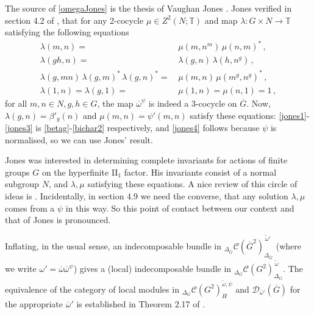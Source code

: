 \documentclass[12pt]{article}
\numberwithin{equation}{section}
\def\cC            {{\mathcal{C}}}
\def\cD            {{\mathcal{D}}}
\def\bbT           {\mathbb{T}}
\begin{document}
 The source of \eqref{omegaJones}
 is the thesis of Vaughan Jones \cite{Jon2}. Jones verified in  section 4.2 of \cite{Jon2},
 that for any  2-cocycle $\mu\in Z^2(N;\bbT)$ and map
 $\lambda:G\times N\rightarrow \bbT$ satisfying the following equations%
 \begin{align}
 \lambda(m,n)=&\,\mu(m,n^m)\,{\mu(n,m)^*}\,,\label{jones1}\\
 \lambda(gh,n)=&\,\lambda(g,n)\,\lambda(h,n^g)\,,\label{jones2}\\
 \lambda(g,mn)\,{\lambda(g,m)^*}\,{\lambda(g,n)^*}=&\,\mu(m,n)\,{\mu(m^g,n^g)^*}\,,\label{jones3}\\
 \lambda(1,n)=\lambda(g,1)=&\,\mu(1,n)=\mu(n,1)=1\,,\label{jones4}\end{align}
for all $m,n\in N,g,h\in G$, the map $\overline{\omega}^\psi$ 
 is indeed a 3-cocycle on $\overline{G}$. Now, $\lambda(g,n)=\beta'_g(n)$ and $\mu(m,n)=\psi'(m,n)$ satisfy these equations: \eqref{jones1}-\eqref{jones3} is
\eqref{betag}-\eqref{bichar2} respectively, and \eqref{jones4} follows because $\psi$ is normalised, so
we can use Jones' result.
 
Jones was interested in  determining complete invariants for actions of  finite groups $G$ on the
 hyperfinite II$_1$ factor. His invariants consist of a normal subgroup $N$, and $\lambda,\mu$ satisfying these equations. A nice review of this circle of ideas is \cite{RSW}. Incidentally, in section 4.9 we need the converse, that any solution $\lambda,\mu$ comes from a $\psi$ in this way. So this point of contact between our context and that of Jones is pronounced.



Inflating, in the usual sense, an
indecomposable bundle in ${}_{\Delta_{\bar{G}}}\cC(\overline{G}^2)_{\Delta_{\bar{G}}}^{\,\tilde{\omega}'}$ (where we write $\omega'=\overline{\omega}\overline{\omega}^\psi$)  gives a (local) indecomposable bundle in ${}_{\Delta_G}\cC(G^2)_{\Delta_G}^{\,\tilde{\omega}}$. The equivalence of the category of local modules in ${}_{\Delta_G}\cC(G^2)^{\tilde{\omega},\psi}_{H}$ and $\cD_{\bar{\omega}'}(\overline{G})$ for the appropriate $\overline{\omega}'$ is established in Theorem 2.17 of \cite{Dav3}.
\end{document}
